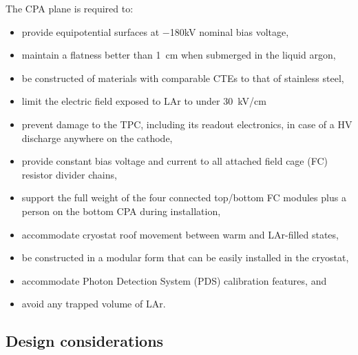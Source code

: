 The CPA plane is required to:
\begin{itemize}
\item provide equipotential surfaces at $-$180kV nominal bias voltage,
\item maintain a flatness better than 1~cm when submerged in the liquid argon,
\item be constructed of materials with comparable CTEs to that of stainless steel, 
\item limit the electric field exposed to LAr to under 30~kV/cm 
\item prevent damage to the TPC, including its readout electronics, in case of a HV discharge anywhere on the cathode,
\item provide constant bias voltage and current to all attached field cage (FC) resistor divider chains,
\item support the full weight of the four connected top/bottom FC modules plus a person on the bottom CPA  during installation,
\item accommodate cryostat roof movement between warm and LAr-filled states,
\item be constructed in a modular form that can be easily installed in the cryostat,
\item accommodate Photon Detection System (PDS) calibration features, and
\item avoid any trapped volume of LAr.
\end{itemize}

\subsection{Design considerations}


